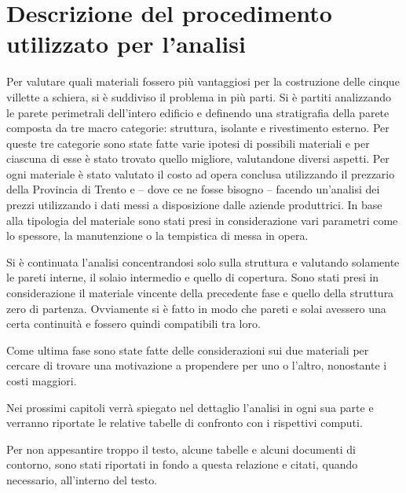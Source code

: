 \section{Descrizione del procedimento utilizzato per l'analisi}
Per valutare quali materiali fossero più vantaggiosi per la costruzione delle cinque villette a schiera, si è suddiviso il problema in più parti.
Si è partiti analizzando le parete perimetrali dell'intero edificio e definendo una stratigrafia della parete composta da tre macro categorie: struttura, isolante e rivestimento esterno.
Per queste tre categorie sono state fatte varie ipotesi di possibili materiali e per ciascuna di esse è stato trovato quello migliore, valutandone diversi aspetti. 
Per ogni materiale è stato valutato il costo ad opera conclusa utilizzando il prezzario della Provincia di Trento e -- dove ce ne fosse bisogno -- facendo un'analisi dei prezzi utilizzando i dati messi a disposizione dalle aziende produttrici.
In base alla tipologia del materiale sono stati presi in considerazione vari parametri come lo spessore, la manutenzione o la tempistica di messa in opera.

Si è continuata l'analisi concentrandosi solo sulla  struttura e valutando solamente le pareti interne, il solaio intermedio e quello di copertura.
Sono stati presi in considerazione il materiale vincente della precedente fase e quello della struttura zero di partenza.
Ovviamente si è fatto in modo che pareti e solai avessero una certa continuità e fossero quindi compatibili tra loro.

Come ultima fase sono state fatte delle considerazioni sui due materiali per cercare di trovare una motivazione a propendere per uno o l'altro, nonostante i costi maggiori. 

Nei prossimi capitoli verrà spiegato nel dettaglio l'analisi in ogni sua parte e verranno riportate le relative tabelle di confronto con i rispettivi computi.

Per non appesantire troppo il testo, alcune tabelle e alcuni documenti di contorno, sono stati riportati in fondo a questa relazione e citati, quando necessario, all'interno del testo.